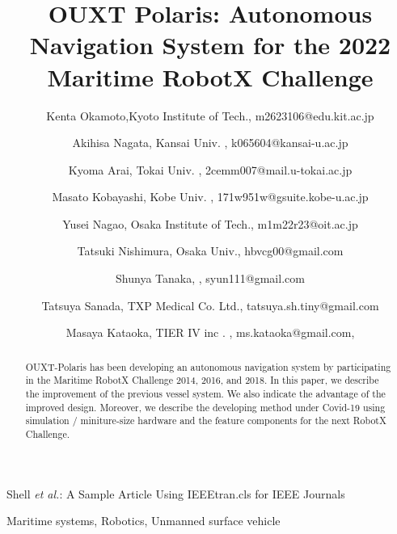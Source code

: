 \documentclass[lettersize,journal]{IEEEtran}
\begin{document}
\title{OUXT Polaris: Autonomous Navigation System for the 2022 Maritime RobotX Challenge}
\author{
    Kenta Okamoto,Kyoto Institute of Tech., m2623106@edu.kit.ac.jp \\ \and
    Akihisa Nagata, Kansai Univ. , k065604@kansai-u.ac.jp \\ \and
    Kyoma Arai, Tokai Univ. , 2cemm007@mail.u-tokai.ac.jp \\ \and
    Masato Kobayashi, Kobe Univ. , 171w951w@gsuite.kobe-u.ac.jp \\ \and
    Yusei Nagao, Osaka Institute of Tech., m1m22r23@oit.ac.jp \\ \and
    Tatsuki Nishimura, Osaka Univ., hbvcg00@gmail.com \\ \and
    Shunya Tanaka, , syun111@gmail.com \\ \and
    Tatsuya Sanada, TXP Medical Co. Ltd., tatsuya.sh.tiny@gmail.com \\ \and
    Masaya Kataoka, TIER IV inc . , ms.kataoka@gmail.com,
}

%
{Shell \MakeLowercase{\textit{et al.}}: A Sample Article Using IEEEtran.cls for IEEE Journals}


\maketitle

\begin{abstract}
OUXT-Polaris has been developing an autonomous navigation system by participating in the 
Maritime RobotX Challenge 2014, 2016, and 2018. 
In this paper, we describe the improvement of the previous vessel system. 
We also indicate the advantage of the improved design.
Moreover, we describe the developing method under Covid-19 using simulation / miniture-size hardware and the 
feature components for the next RobotX Challenge.
\end{abstract}

\begin{IEEEkeywords}
Maritime systems, Robotics, Unmanned surface vehicle
\end{IEEEkeywords}
\end{document}
